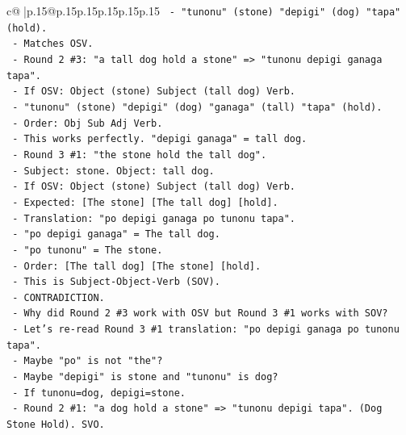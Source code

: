 \documentclass{article}
\begin{document}
{\begin{supertabular}{c@{$\;$}|p{.15\linewidth}@{}p{.15\linewidth}p{.15\linewidth}p{.15\linewidth}p{.15\linewidth}p{.15\linewidth}}
{{{\texttt{                  {-} "tunonu" (stone) "depigi" (dog) "tapa" (hold).} \\
\texttt{                  {-} Matches OSV.} \\
\texttt{                {-} Round 2 \#3: "a tall dog hold a stone" => "tunonu depigi ganaga tapa".} \\
\texttt{                  {-} If OSV: Object (stone) Subject (tall dog) Verb.} \\
\texttt{                  {-} "tunonu" (stone) "depigi" (dog) "ganaga" (tall) "tapa" (hold).} \\
\texttt{                  {-} Order: Obj Sub Adj Verb.} \\
\texttt{                  {-} This works perfectly. "depigi ganaga" = tall dog.} \\
\texttt{                {-} Round 3 \#1: "the stone hold the tall dog".} \\
\texttt{                  {-} Subject: stone. Object: tall dog.} \\
\texttt{                  {-} If OSV: Object (stone) Subject (tall dog) Verb.} \\
\texttt{                  {-} Expected: {[}The stone{]} {[}The tall dog{]} {[}hold{]}.} \\
\texttt{                  {-} Translation: "po depigi ganaga po tunonu tapa".} \\
\texttt{                  {-} "po depigi ganaga" = The tall dog.} \\
\texttt{                  {-} "po tunonu" = The stone.} \\
\texttt{                  {-} Order: {[}The tall dog{]} {[}The stone{]} {[}hold{]}.} \\
\texttt{                  {-} This is Subject{-}Object{-}Verb (SOV).} \\
\texttt{                  {-} CONTRADICTION.} \\
\texttt{                  {-} Why did Round 2 \#3 work with OSV but Round 3 \#1 works with SOV?} \\
\texttt{                  {-} Let's re{-}read Round 3 \#1 translation: "po depigi ganaga po tunonu tapa".} \\
\texttt{                  {-} Maybe "po" is not "the"?} \\
\texttt{                  {-} Maybe "depigi" is stone and "tunonu" is dog?} \\
\texttt{                    {-} If tunonu=dog, depigi=stone.} \\
\texttt{                    {-} Round 2 \#1: "a dog hold a stone" => "tunonu depigi tapa". (Dog Stone Hold). SVO.} \\
}}}
\end{supertabular}}
\end{document}
